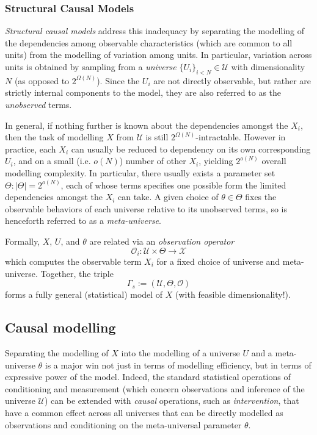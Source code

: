 \documentclass{article}
\begin{document}
\subsubsection{Structural Causal Models}

\textit{Structural causal models} address this inadequacy by separating the modelling of the dependencies among observable characteristics (which are common to all units) from the modelling of variation among units. In particular, variation across units is obtained by sampling from a \textit{universe} $\{U_i\}_{i < N} \in \mathcal{U}$ with dimensionality $N$ (as opposed to $2^{\Omega(N)}$). Since the $U_i$ are not directly observable, but rather are strictly internal components to the model, they are also referred to as the \textit{unobserved} terms.

In general, if nothing further is known about the dependencies amongst the $X_i$, then the task of modelling $X$ from $\mathcal{U}$ is still $2^{\Omega(N)}$-intractable. However in practice, each $X_i$ can usually be reduced to dependency on its own corresponding $U_i$, and on a small (i.e. $o(N)$) number of other $X_i$, yielding $2^{o(N)}$ overall modelling complexity. In particular, there usually exists a parameter set $\Theta: |\Theta| = 2^{o(N)}$, each of whose terms specifies one possible form the limited dependencies amongst the $X_i$ can take. A given choice of $\theta \in \Theta$ fixes the observable behaviors of each universe relative to its unobserved terms, so is henceforth referred to as a \textit{meta-universe}.

Formally, $X$, $U$, and $\theta$ are related via an \textit{observation operator} $$\mathcal{O}_i : \mathcal{U} \times \Theta \to \mathcal{X}$$ which computes the observable term $X_i$ for a fixed choice of universe and meta-universe. Together, the triple $$\Gamma_s := (\mathcal{U}, \Theta, \mathcal{O})$$ forms a fully general (statistical) model of $X$ (with feasible dimensionality!).

\subsection{Causal modelling}

Separating the modelling of $X$ into the modelling of a universe $U$ and a meta-universe $\theta$ is a major win not just in terms of modelling efficiency, but in terms of expressive power of the model. Indeed, the standard statistical operations of conditioning and measurement (which concern observations and inference of the universe $\mathcal{U}$) can be extended with \textit{causal} operations, such as \textit{intervention}, that have a common effect across all universes that can be directly modelled as observations and conditioning on the meta-universal parameter $\theta$.
\end{document}
